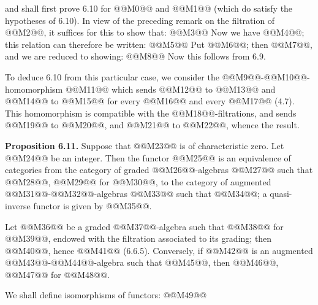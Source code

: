 and shall first prove 6.10 for @@M0@@ and @@M1@@ (which do satisfy the hypotheses of 6.10). In view of the preceding remark on the filtration of @@M2@@, it suffices for this to show that:
@@M3@@
Now we have @@M4@@; this relation can therefore be written:
@@M5@@
Put @@M6@@; then @@M7@@, and we are reduced to showing:
@@M8@@
Now this follows from 6.9.

To deduce 6.10 from this particular case, we consider the @@M9@@-@@M10@@-homomorphism @@M11@@ which sends @@M12@@ to @@M13@@ and @@M14@@ to @@M15@@ for every @@M16@@ and every @@M17@@ (4.7). This homomorphism is compatible with the @@M18@@-filtrations, and sends @@M19@@ to @@M20@@, and @@M21@@ to @@M22@@, whence the result.

\textbf{Proposition 6.11.} Suppose that @@M23@@ is of characteristic zero. Let @@M24@@ be an integer. Then the functor @@M25@@ is an equivalence of categories from the category of graded @@M26@@-algebras @@M27@@ such that @@M28@@, @@M29@@ for @@M30@@, to the category of augmented @@M31@@-@@M32@@-algebras @@M33@@ such that @@M34@@; a quasi-inverse functor is given by @@M35@@.

Let @@M36@@ be a graded @@M37@@-algebra such that @@M38@@ for @@M39@@, endowed with the filtration associated to its grading; then @@M40@@, hence @@M41@@ (6.6.5). Conversely, if @@M42@@ is an augmented @@M43@@-@@M44@@-algebra such that @@M45@@, then @@M46@@, @@M47@@ for @@M48@@.

We shall define isomorphisms of functors:
@@M49@@

